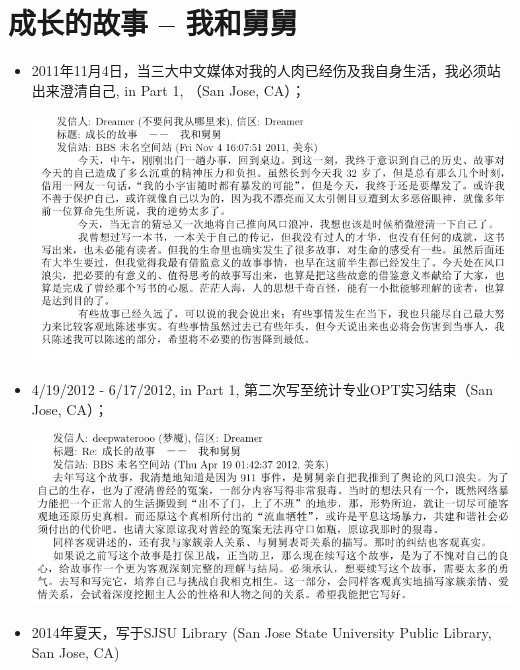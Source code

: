 \documentclass[9pt, b5paper]{article}
\begin{document}
\section{成长的故事 -- 我和舅舅}
\label{sec:org75ff268}
\begin{itemize}
\item 2011年11月4日，当三大中文媒体对我的人肉已经伤及我自身生活，我必须站出来澄清自己, in Part 1, （San Jose, CA）；

\begin{center}
\includegraphics[width=.9\linewidth]{./pic/dreamer1.png}
\end{center}
\item 4/19/2012 - 6/17/2012, in Part 1, 第二次写至统计专业OPT实习结束（San Jose, CA）；

\begin{center}
\includegraphics[width=.9\linewidth]{./pic/dreamer2.png}
\end{center}
\item 2014年夏天，写于SJSU Library (San Jose State University Public Library, San Jose, CA)


\end{itemize}
\end{document}
